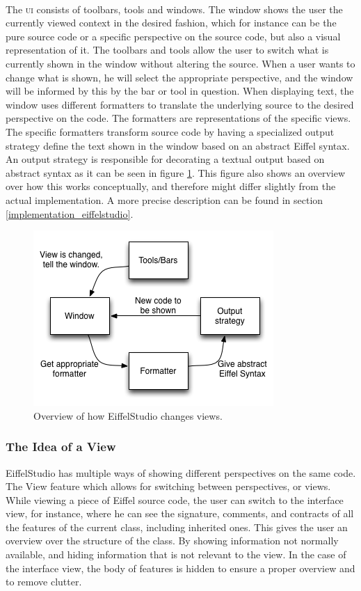 \paragraph{}
The \textsc{ui} consists of toolbars, tools and windows. The window shows the user the currently viewed context in the desired fashion, which for instance can be the pure source code or a specific perspective on the source code, but also a visual representation of it. The toolbars and tools allow the user to switch what is currently shown in the window without altering the source. When a user wants to change what is shown, he will select the appropriate perspective, and the window will be informed by this by the bar or tool in question. When displaying text, the window uses different formatters to translate the underlying source to the desired perspective on the code. The formatters are representations of the specific views. The specific formatters transform source code by having a specialized output strategy define the text shown in the window based on an abstract Eiffel syntax. An output strategy is responsible for decorating a textual output based on abstract syntax as it can be seen in figure \ref{fig:eiffelstudio_view_change}. This figure also shows an overview over how this works conceptually, and therefore might differ slightly from the actual implementation. A more precise description can be found in section \ref{implementation_eiffelstudio}.

\begin{figure}[H]
\centerline{
\includegraphics[scale=0.7]{images/eiffel_view_text_design.png}
}
\caption[EiffelStudio view control]{Overview of how EiffelStudio changes views.}
\label{fig:eiffelstudio_view_change}
\end{figure}

\subsubsection{The Idea of a View}
\label{why_a_view}
EiffelStudio has multiple ways of showing different perspectives on the same code. The View feature which allows for switching between perspectives, or views. While viewing a piece of Eiffel source code, the user can switch to the interface view, for instance, where he can see the signature, comments, and contracts of all the features  of the current class, including inherited ones. This gives the user an overview over the structure of the class. By showing information not normally available, and hiding information that is not relevant to the view. In the case of the interface view, the body of features is hidden to ensure a proper overview and to remove clutter.

